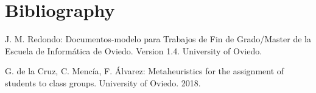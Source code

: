 \renewcommand{\documentname}{Bibliography}

\chapter{Bibliography}

\begin{thebibliography}{8}

        J. M. Redondo: Documentos-modelo para Trabajos de Fin de Grado/Master de la Escuela de Informática de Oviedo. Version 1.4. University of Oviedo.

        G. de la Cruz, C. Mencía, F. Álvarez: Metaheuristics for the assignment of students to class groups. University of Oviedo. 2018.

\end{thebibliography}

